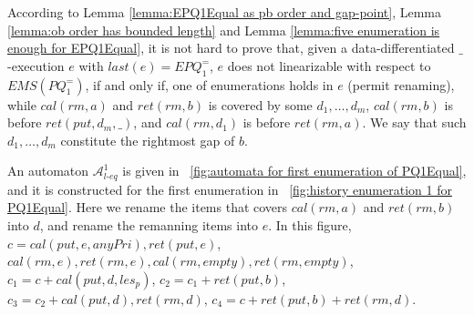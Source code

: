 According to Lemma \ref{lemma:EPQ1Equal as pb order and gap-point}, Lemma \ref{lemma:ob order has bounded length} and Lemma \ref{lemma:five enumeration is enough for EPQ1Equal}, it is not hard to prove that, given a data-differentiated $\_$-execution $e$ with $\textit{last}(e) = \textit{EPQ}_1^{=}$, $e$ does not linearizable with respect to $\textit{EMS}(\textit{PQ}_1^{=})$, if and only if, one of enumerations holds in $e$ (permit renaming), while $\textit{cal}(\textit{rm},a)$ and $\textit{ret}(\textit{rm},b)$ is covered by some $d_1,\ldots,d_m$, $\textit{cal}(\textit{rm},b)$ is before $\textit{ret}(\textit{put},d_m,\_)$, and $\textit{cal}(\textit{rm},d_1)$ is before $\textit{ret}(\textit{rm},a)$. We say that such $d_1,\ldots,d_m$ constitute the rightmost gap of $b$.


An automaton $\mathcal{A}_{\textit{l-eq}}^1$ is given in \figurename~\ref{fig:automata for first enumeration of PQ1Equal}, and it is constructed for the first enumeration in \figurename~\ref{fig:history enumeration 1 for PQ1Equal}. Here we rename the items that covers $\textit{cal}(\textit{rm},a)$ and $\textit{ret}(\textit{rm},b)$ into $d$, and rename the remanning items into $e$. In this figure, $c = \textit{cal}(\textit{put},e,\textit{anyPri}),\textit{ret}(\textit{put},e)$, $\textit{cal}(\textit{rm},e), \textit{ret}(\textit{rm},e),\textit{cal}(\textit{rm},\textit{empty}),\textit{ret}(\textit{rm},\textit{empty})$, $c_1 = c + \textit{cal}(\textit{put},d,\textit{les}_p)$, $c_2 = c_1 + \textit{ret}(\textit{put},b)$, $c_3 = c_2 + \textit{cal}(\textit{put},d),\textit{ret}(\textit{rm},d)$, $c_4 = c + \textit{ret}(\textit{put},b) + \textit{ret}(\textit{rm},d)$.


